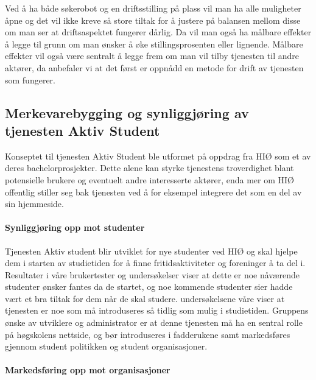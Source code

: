 Ved å ha både søkerobot og en driftsstilling på plass vil man ha alle muligheter åpne og det vil ikke kreve så store tiltak for å justere på balansen mellom disse om man ser at driftsaspektet fungerer dårlig. Da vil man også ha målbare effekter å legge til grunn om man ønsker å øke stillingsprosenten eller lignende. Målbare effekter vil også være sentralt å legge frem om man vil tilby tjenesten til andre aktører, da anbefaler vi at det først er oppnådd en metode for drift av tjenesten som fungerer.

\subsection{Merkevarebygging og synliggjøring av tjenesten Aktiv Student}
Konseptet til tjenesten Aktiv Student ble utformet på oppdrag fra HIØ som et av deres bachelorprosjekter. Dette alene kan styrke tjenestens troverdighet blant potensielle brukere og eventuelt andre interesserte aktører, enda mer om HIØ offentlig stiller seg bak tjenesten ved å for eksempel integrere det som en del av sin hjemmeside.

\paragraph{Synliggjøring opp mot studenter}

Tjenesten Aktiv student blir utviklet for nye studenter ved HIØ og skal hjelpe dem i starten av studietiden for å finne fritidsaktiviteter og foreninger å ta del i. Resultater i våre brukertester og undersøkelser viser at dette er noe nåværende studenter ønsker fantes da de startet, og noe kommende studenter sier hadde vært et bra tiltak for dem når de skal studere. 
undersøkelsene våre viser at tjenesten er noe som må introduseres så tidlig som mulig i studietiden. Gruppens ønske av utviklere og administrator er at denne tjenesten må ha en sentral rolle på høgskolens nettside, og bør introduseres i fadderukene samt markedsføres gjennom student politikken og student organisasjoner.

\paragraph{Markedsføring opp mot organisasjoner}

